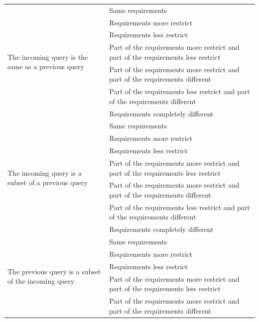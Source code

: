 \documentclass[12pt,a4paper,oneside]{article}
\theoremstyle{definition}
\begin{document}
\begin{center}
\begin{longtable}{|l|p{8cm}|}
\multirow{7}{6cm}{The incoming query is the same as a previous query}  & Same requirements \\ \cline{2-2} 
                  & Requirements more restrict \\ \cline{2-2} 
                  & Requirements less restrict \\ \cline{2-2} 
                  & Part of the requirements more restrict and part of the requirements less restrict \\ \cline{2-2} 
                  & Part of the requirements more restrict and part of the requirements different \\ \cline{2-2} 
                  & Part of the requirements less restrict and part of the requirements different \\ \cline{2-2} 
                  & Requirements completely different \\ \hline
\multirow{7}{6cm}{The incoming query is a subset of a previous query}  &Same requirements \\ \cline{2-2} 
                  & Requirements more restrict \\ \cline{2-2} 
                  & Requirements less restrict \\ \cline{2-2} 
                  & Part of the requirements more restrict and part of the requirements less restrict \\ \cline{2-2} 
                  & Part of the requirements more restrict and part of the requirements different \\ \cline{2-2} 
                  & Part of the requirements less restrict and part of the requirements different \\ \cline{2-2} 
                  & Requirements completely different \\ \hline
\multirow{7}{6cm}{The previous query is a subset of the incoming query}  & Same requirements \\ \cline{2-2} 
                  & Requirements more restrict \\ \cline{2-2} 
                  & Requirements less restrict \\ \cline{2-2} 
                  & Part of the requirements more restrict and part of the requirements less restrict \\ \cline{2-2} 
                  & Part of the requirements more restrict and part of the requirements different \\ \cline{2-2} 

\end{longtable}
\end{center}
\end{document}

